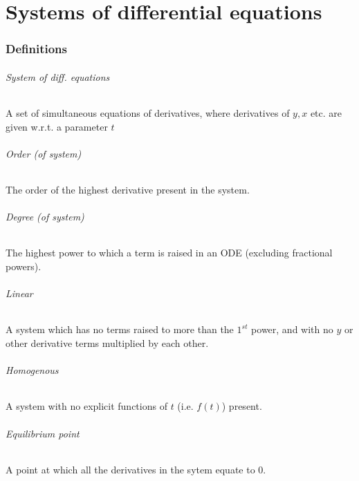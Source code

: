 \documentclass{article}
\begin{document}
\newpage
\part{Systems of differential equations}

\section{Definitions}

\paragraph{System of diff. equations}
A set of simultaneous equations of derivatives, where derivatives of $ y, x $ etc. are given w.r.t. a parameter $ t $

\paragraph{Order (of system)}
The order of the highest derivative present in the system.

\paragraph{Degree (of system)}
The highest power to which a term is raised in an ODE (excluding fractional powers).

\paragraph{Linear}
A system which has no terms raised to more than the $ 1^{st} $ power, and with no $ y $ or other derivative terms multiplied by each other.

\paragraph{Homogenous}
A system with no explicit functions of $ t $ (i.e. $ f(t) $) present.

\paragraph{Equilibrium point}
A point at which all the derivatives in the sytem equate to 0.
\end{document}
